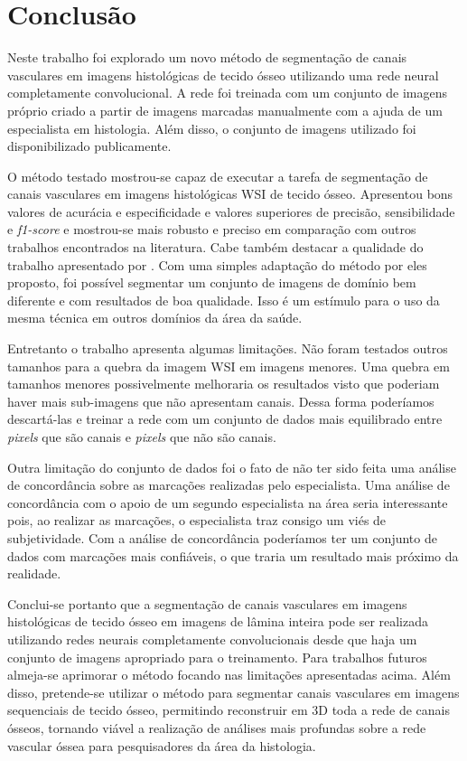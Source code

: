 \chapter[Conclusão]{Conclusão}

Neste trabalho foi explorado um novo método de segmentação de canais vasculares em imagens histológicas de tecido ósseo utilizando uma rede neural completamente convolucional. A rede foi treinada com um conjunto de imagens próprio criado a partir de imagens marcadas manualmente com a ajuda de um especialista em histologia. Além disso, o conjunto de imagens utilizado foi disponibilizado publicamente. 

O método testado mostrou-se capaz de executar a tarefa de segmentação de canais vasculares em imagens histológicas WSI de tecido ósseo. Apresentou bons valores de acurácia e especificidade e valores superiores de precisão, sensibilidade e \textit{f1-score} e mostrou-se mais robusto e preciso em comparação com outros trabalhos encontrados na literatura. Cabe também destacar a qualidade do trabalho apresentado por \cite{santos2022automated}. Com uma simples adaptação do método por eles proposto, foi possível segmentar um conjunto de imagens de domínio bem diferente e com resultados de boa qualidade. Isso é um estímulo para o uso da mesma técnica em outros domínios da área da saúde.

Entretanto o trabalho apresenta algumas limitações. Não foram testados outros tamanhos para a quebra da imagem WSI em imagens menores. Uma quebra em tamanhos menores possivelmente melhoraria os resultados visto que  poderiam haver mais sub-imagens que não apresentam canais. Dessa forma poderíamos descartá-las e treinar a rede com um conjunto de dados mais equilibrado entre \textit{pixels} que são canais e \textit{pixels} que não são canais.

Outra limitação do conjunto de dados foi o fato de não ter sido feita uma análise de concordância sobre as marcações realizadas pelo especialista. Uma análise de concordância com o apoio de um segundo especialista na área seria interessante pois, ao realizar as marcações, o especialista traz consigo um viés de subjetividade. Com a análise de concordância poderíamos ter um conjunto de dados com marcações mais confiáveis, o que traria um resultado mais próximo da realidade.

Conclui-se portanto que a segmentação de canais vasculares em imagens histológicas de tecido ósseo em imagens de lâmina inteira pode ser realizada utilizando redes neurais completamente convolucionais desde que haja um conjunto de imagens apropriado para o treinamento. Para trabalhos futuros almeja-se aprimorar o método focando nas limitações apresentadas acima. Além disso, pretende-se utilizar o método para segmentar canais vasculares em imagens sequenciais de tecido ósseo, permitindo reconstruir em 3D toda a rede de canais ósseos, tornando viável a realização de análises mais profundas sobre a rede vascular óssea para pesquisadores da área da histologia.

